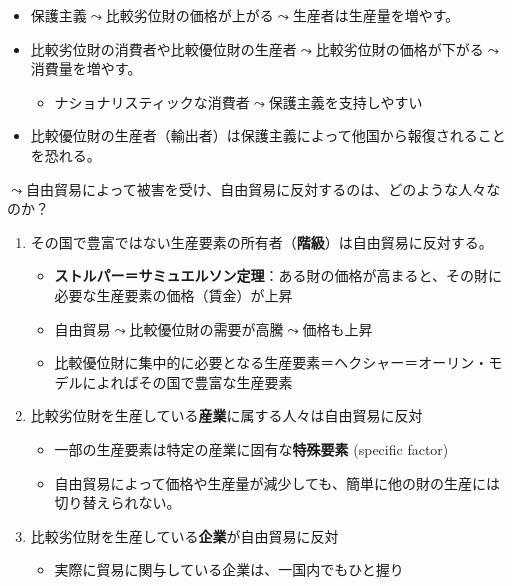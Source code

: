 \documentclass[
  xelatex,
  ja=standard]{bxjsarticle}
\providecommand{\tightlist}{%
  \setlength{\itemsep}{0pt}\setlength{\parskip}{0pt}}\usepackage{longtable,booktabs,array}
\begin{document}
\begin{itemize}
\tightlist
\item
  保護主義\(\leadsto\)比較劣位財の価格が上がる\(\leadsto\)生産者は生産量を増やす。
\item
  比較劣位財の消費者\citep{baker2005}や比較優位財の生産者\(\leadsto\)比較劣位財の価格が下がる\(\leadsto\)消費量を増やす。

  \begin{itemize}
  \tightlist
  \item
    ナショナリスティックな消費者\(\leadsto\)保護主義を支持しやすい\citep{mansfield2013}
  \end{itemize}
\item
  比較優位財の生産者（輸出者）は保護主義によって他国から報復されることを恐れる。
\end{itemize}

\(\leadsto\)自由貿易によって被害を受け、自由貿易に反対するのは、どのような人々なのか？

\begin{enumerate}
\def\labelenumi{\arabic{enumi}.}
\tightlist
\item
  その国で豊富ではない生産要素の所有者（\textbf{階級}）は自由貿易に反対する。

  \begin{itemize}
  \tightlist
  \item
    \textbf{ストルパー＝サミュエルソン定理}：ある財の価格が高まると、その財に必要な生産要素の価格（賃金）が上昇
  \item
    自由貿易\(\leadsto\)比較優位財の需要が高騰\(\leadsto\)価格も上昇
  \item
    比較優位財に集中的に必要となる生産要素＝ヘクシャー＝オーリン・モデルによればその国で豊富な生産要素
  \end{itemize}
\item
  比較劣位財を生産している\textbf{産業}に属する人々は自由貿易に反対\citep{mayda2005}

  \begin{itemize}
  \tightlist
  \item
    一部の生産要素は特定の産業に固有な\textbf{特殊要素} (specific
    factor)
  \item
    自由貿易によって価格や生産量が減少しても、簡単に他の財の生産には切り替えられない。
  \end{itemize}
\item
  比較劣位財を生産している\textbf{企業}が自由貿易に反対

  \begin{itemize}
  \tightlist
  \item
    実際に貿易に関与している企業は、一国内でもひと握り\citep{freund2020}
  \end{itemize}
\end{enumerate}
\end{document}
